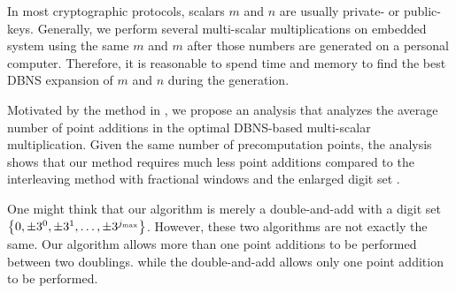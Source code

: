 In most cryptographic protocols, scalars $m$ and $n$ are usually private- or public-keys.
Generally, we perform several multi-scalar multiplications on embedded system using the same $m$ and $m$ after those numbers are generated on a personal computer.
Therefore, it is reasonable to spend time and memory to find the best DBNS expansion of $m$ and $n$ during the generation.

Motivated by the method in \cite{analysisMethod},
we propose an analysis that analyzes the average number of point additions in the optimal DBNS-based multi-scalar multiplication.
Given the same number of precomputation points, the analysis shows that our method requires much less point additions compared to
the interleaving method with fractional windows \cite{fractional} and the enlarged digit set \cite{analysisMethod}.

One might think that our algorithm is merely a double-and-add with a digit set $\left\{0, \pm 3^0, \pm 3^1, \dots, \pm 3^{j_{\rm max}} \right\}$.
However, these two algorithms are not exactly the same.
Our algorithm allows more than one point additions to be performed between two doublings.
while the double-and-add allows only one point addition to be performed.
